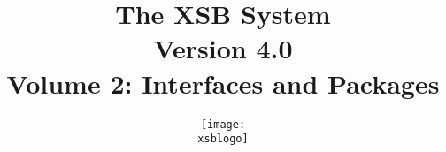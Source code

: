 \documentclass[12pt]{report}
\newcommand{\version}{Version 4.0}
\newcommand{\xsblogo}{{xsb-logo}}
\begin{document}
\title{\bf The XSB System \\ \version \\ Volume 2:
Interfaces and Packages}

\author{{\texttt{[image: \\xsblogo]}}\\
        \ \\ \ \\
} 

\maketitle


\thispagestyle{empty}

\newpage
\thispagestyle{empty}
%

\tableofcontents
\newpage        %
  

%
%




















%
%





\printindex
\printindex[pred]
\end{document}
